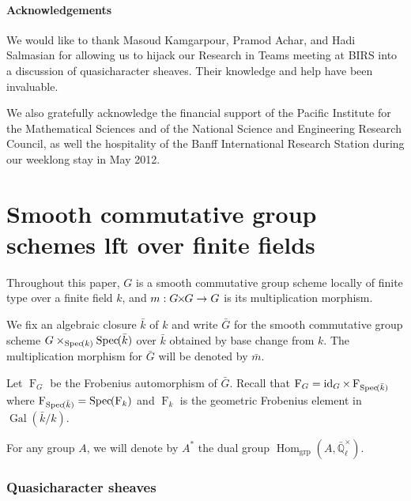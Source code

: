 \documentclass[11pt]{amsart}
\theoremstyle{plain}
\theoremstyle{definition}
\theoremstyle{remark}
\newcommand{\Spec}[1]{{\operatorname{Spec}\hskip-1pt( #1 )}}
\newcommand{\EE}{\mathbb{\bar Q}_\ell}
\newcommand{\bFq}{\bar{k}}
\newcommand{\Fq}{k}
\newcommand{\EEx}{\EE^\times}
\DeclareMathOperator{\Gal}{Gal}
\newcommand{\Frob}[1]{\operatorname{F}_{#1}}
\DeclareMathOperator{\Hom}{Hom}
\DeclareMathOperator{\id}{id}
\newcommand{\bm}{\bar{m}}
\newcommand{\bG}{\bar{G}}
\newcommand{\tight}[3]{\hspace{-#1pt}{#2}\hspace{-#3pt}}
\newcommand{\GxG}{\text{$G \tight{1}{\times}{1} G$}}
\begin{document}
\subsection*{Acknowledgements}

We would like to thank Masoud Kamgarpour, Pramod Achar, and Hadi Salmasian
for allowing us to hijack our Research in Teams meeting at BIRS into a discussion of
quasicharacter sheaves.  Their knowledge and help have been invaluable.

We also gratefully acknowledge the financial support of the Pacific Institute for the Mathematical Sciences
and of the National Science and Engineering Research Council,
as well the hospitality of the Banff International Research Station during our weeklong stay in May 2012.

\tableofcontents

\part{Smooth commutative group schemes lft over finite fields} \label{part1}

Throughout this paper, $G$ is a smooth commutative group scheme locally of finite type over a finite field $\Fq$, and $m : \GxG\to G$ is its multiplication morphism.

We fix an algebraic closure $\bFq$ of $\Fq$ and write $\bG$ for the
smooth commutative group scheme $G \times_{\Spec{\Fq}} \Spec{\bFq}$ over $\bFq$ obtained by base change from $k$. The multiplication morphism for $\bG$ will be denoted by $\bm$. 

Let $\Frob{G}$ be the Frobenius automorphism of $\bG$.
Recall that $\Frob{G} = \id_{G}\times \Frob{\Spec{\bFq}}$ where
$\Frob{\Spec{\bFq}} = \Spec{\Frob{\Fq}}$ and $\Frob{\Fq}$  is the geometric Frobenius element in $\Gal(\bFq/\Fq)$.

For any group $A$, we will denote by $A^*$ the dual group $\Hom_\text{grp}(A, \EEx)$.


\section{Quasicharacter sheaves}\label{sec:category}
\end{document}
